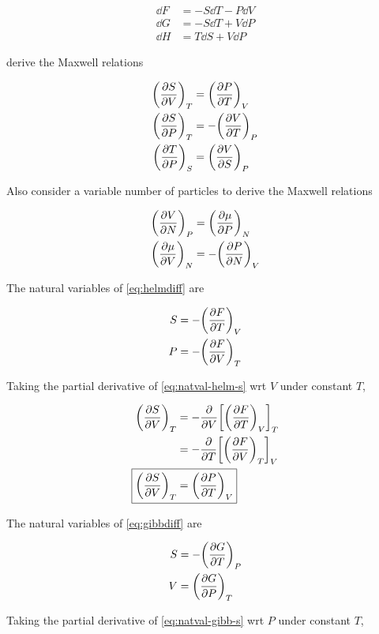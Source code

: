 \documentclass[9pt,a4paper,twocolumn]{article}
\begin{document}
\begin{align}
	\dd{F} &= -S\dd{T} - P\dd{V} \label{eq:helmdiff} \\
	\dd{G} &= -S\dd{T} + V\dd{P} \label{eq:gibbdiff} \\
	\dd{H} &= T\dd{S} + V\dd{P} \label{eq:enthalpydiff}
\end{align}

derive the Maxwell relations

\begin{align}
	\qty(\pdv{S}{V})_T &= \qty(\pdv{P}{T})_V \\
	\qty(\pdv{S}{P})_T &= -\qty(\pdv{V}{T})_P \\
	\qty(\pdv{T}{P})_S &= \qty(\pdv{V}{S})_P
\end{align}

Also consider a variable number of particles to derive the Maxwell relations

\begin{align}
	\qty(\pdv{V}{N})_P &= \qty(\pdv{\mu}{P})_N \\
	\qty(\pdv{\mu}{V})_N &= -\qty(\pdv{P}{N})_V
\end{align}

The natural variables of \eqref{eq:helmdiff} are

\begin{align}
	S &= -\qty(\pdv{F}{T})_V \label{eq:natval-helm-s} \\
	P &= -\qty(\pdv{F}{V})_T \label{eq:natval-helm-p}
\end{align}

Taking the partial derivative of \eqref{eq:natval-helm-s} wrt $V$ under constant $T$,

\begin{align}
	\qty(\pdv{S}{V})_T &= -\pdv{V}\qty[\qty(\pdv{F}{T})_V]_T \nonumber \\
	&= -\pdv{T} \qty[\qty(\pdv{F}{V})_T]_V \nonumber \\
	\Aboxed{
		\qty(\pdv{S}{V})_T &= \qty(\pdv{P}{T})_V
	} \label{eq:proof-svt}
\end{align}

The natural variables of \eqref{eq:gibbdiff} are

\begin{align}
	S &= -\qty(\pdv{G}{T})_P \label{eq:natval-gibb-s} \\
	V &= \qty(\pdv{G}{P})_T \label{eq:natval-gibb-v}
\end{align}

Taking the partial derivative of \eqref{eq:natval-gibb-s} wrt $P$ under constant $T$,
\end{document}
